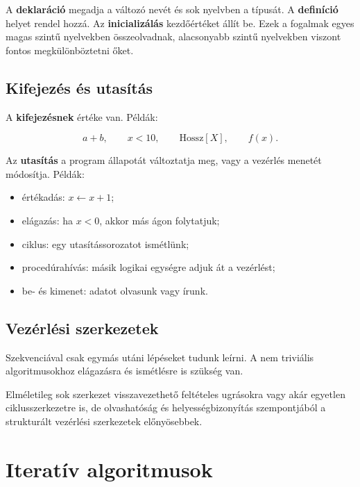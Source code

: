 \begin{center}

\end{center}

A \textbf{deklaráció} megadja a változó nevét és sok nyelvben a típusát. A \textbf{definíció} helyet rendel hozzá. Az \textbf{inicializálás} kezdőértéket állít be. Ezek a fogalmak egyes magas szintű nyelvekben összeolvadnak, alacsonyabb szintű nyelvekben viszont fontos megkülönböztetni őket.

\subsection{Kifejezés és utasítás}

A \textbf{kifejezésnek} értéke van. Példák:

\[
a+b,\qquad x<10,\qquad \text{Hossz}[X],\qquad f(x).
\]

Az \textbf{utasítás} a program állapotát változtatja meg, vagy a vezérlés menetét módosítja. Példák:

\begin{itemize}
  \item értékadás: $x\leftarrow x+1$;
  \item elágazás: ha $x<0$, akkor más ágon folytatjuk;
  \item ciklus: egy utasítássorozatot ismétlünk;
  \item procedúrahívás: másik logikai egységre adjuk át a vezérlést;
  \item be- és kimenet: adatot olvasunk vagy írunk.
\end{itemize}

\subsection{Vezérlési szerkezetek}

Szekvenciával csak egymás utáni lépéseket tudunk leírni. A nem triviális algoritmusokhoz elágazásra és ismétlésre is szükség van.

\begin{center}

\end{center}

Elméletileg sok szerkezet visszavezethető feltételes ugrásokra vagy akár egyetlen ciklusszerkezetre is, de olvashatóság és helyességbizonyítás szempontjából a strukturált vezérlési szerkezetek előnyösebbek.

\section{Iteratív algoritmusok}


